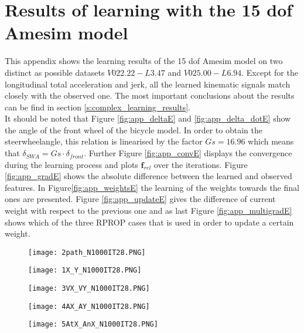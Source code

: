 \chapter{Results of learning with the 15 dof Amesim model}
\label{app:E}
This appendix shows the learning results of the 15 dof Amesim model on two distinct as possible datasets $V022.22 - L3.47$ and $V025.00 - L6.94$. Except for the longitudinal total acceleration and jerk, all the learned kinematic signals match closely with the observed one. The most important conclusions about the results can be find in section \ref{s:complex_learning_results}.\\
It should be noted that Figure \ref{fig:app_deltaE} and \ref{fig:app_delta_dotE}  show the angle of the front wheel of the bicycle model. In order to obtain the steerwheelangle, this relation is linearised by the factor $Gs = 16.96$ which means that $\delta_{SWA} = Gs\cdot\delta_{front}$. Further Figure \ref{fig:app_convE} displays the convergence during the learning process and plots $\bm{f}_{rel}$ over the iterations. Figure \ref{fig:app_gradE} shows the absolute difference between the learned and observed features. In Figure\ref{fig:app_weightsE} the learning of the weights towards the final ones are presented. Figure \ref{fig:app_updateE} gives the difference of current weight with respect to the previous one and as last Figure \ref{fig:app_multigradE} shows which of the three RPROP cases that is used in order to update a certain weight.



\begin{figure}[h!]
	\centering
	\texttt{[image: 2path\_N1000IT28.PNG]}
\end{figure}

\begin{figure}[h!]
	\centering
	\texttt{[image: 1X\_Y\_N1000IT28.PNG]}
\end{figure}


\begin{figure}[h!]
	\centering
	\texttt{[image: 3VX\_VY\_N1000IT28.PNG]}
\end{figure}


\begin{figure}[h!]
	\centering
	\texttt{[image: 4AX\_AY\_N1000IT28.PNG]}
\end{figure}


\begin{figure}[h!]
	\centering
	\texttt{[image: 5AtX\_AnX\_N1000IT28.PNG]}
\end{figure}

